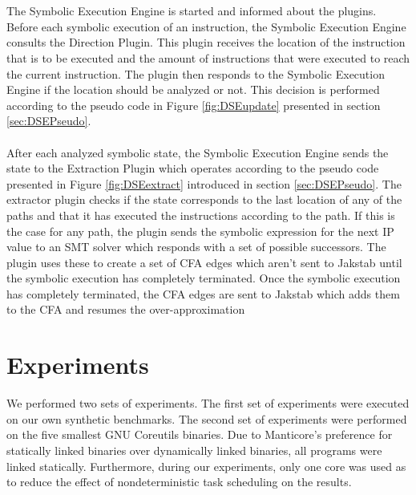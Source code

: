 \documentclass{kththesis}
\newcommand{\fbcomment}[1]{{#1}}
\renewcommand{\fbcomment}[1]{}
\begin{document}
\\ \\
The Symbolic Execution Engine is started and informed about the plugins. Before each symbolic execution of an instruction, the Symbolic Execution Engine consults the Direction Plugin. This plugin receives the location of the instruction that is to be executed and the amount of instructions that were executed to reach the current instruction. The plugin then responds to the Symbolic Execution Engine if the location should be analyzed or not. This decision is performed according to the pseudo code in Figure \ref{fig:DSEupdate} presented in section \ref{sec:DSEPseudo}. 
\\ \\
After each analyzed symbolic state, the Symbolic Execution Engine sends the state to the Extraction Plugin which operates according to the pseudo code presented in Figure \ref{fig:DSEextract} introduced in section \ref{sec:DSEPseudo}. The extractor plugin checks if the state corresponds to the last location of any of the paths and that it has executed the instructions according to the path. If this is the case for any path, the plugin sends the symbolic expression for the next IP value to an SMT solver which responds with a set of possible successors. The plugin uses these to create a set of CFA edges which aren't sent to Jakstab until the symbolic execution has completely terminated. Once the symbolic execution has completely terminated, the CFA edges are sent to Jakstab which adds them to the CFA and resumes the over-approximation
\section{Experiments}
\fbcomment{\color{red}Goal: Describe what experiments were done and why. Also, describe with enough details for the experiments to be reproducible}
We performed two sets of experiments. The first set of experiments were executed on our own synthetic benchmarks. The second set of experiments were performed on the five smallest GNU Coreutils binaries. Due to Manticore's preference for statically linked binaries over dynamically linked binaries, all programs were linked statically. Furthermore, during our experiments, only one core was used as to reduce the effect of nondeterministic task scheduling on the results. 
\end{document}
